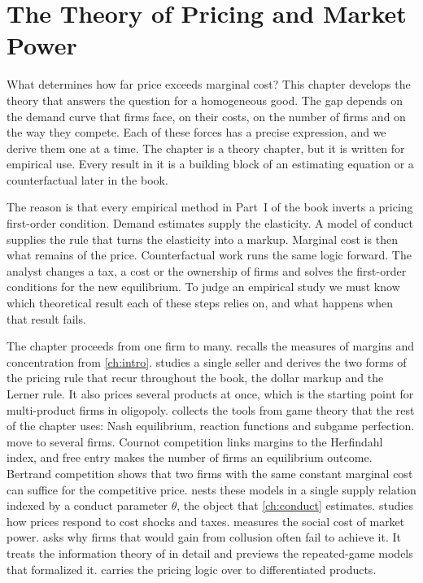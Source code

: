 \chapter{The Theory of Pricing and Market Power}\label{ch:theory}

What determines how far price exceeds marginal cost? This chapter develops the theory that answers the question for
a homogeneous good. The gap depends on the demand curve that firms face, on their costs, on the number of firms and
on the way they compete. Each of these forces has a precise expression, and we derive them one at a time. The
chapter is a theory chapter, but it is written for empirical use. Every result in it is a building block of an
estimating equation or a counterfactual later in the book.

The reason is that every empirical method in Part~I of the book inverts a pricing first-order condition. Demand
estimates supply the elasticity. A model of conduct supplies the rule that turns the elasticity into a markup.
Marginal cost is then what remains of the price. Counterfactual work runs the same logic forward. The analyst
changes a tax, a cost or the ownership of firms and solves the first-order conditions for the new equilibrium. To
judge an empirical study we must know which theoretical result each of these steps relies on, and what happens when
that result fails.

The chapter proceeds from one firm to many.  recalls the measures of margins and
concentration from \cref{ch:intro}.
 studies a single seller and derives the two forms of the pricing rule that recur throughout
the book, the dollar markup and the Lerner rule. It also prices several products at once, which is the starting point
for multi-product firms in oligopoly.  collects the tools from game theory that the rest of the
chapter uses: Nash equilibrium, reaction functions and subgame perfection.  move to
several firms. Cournot competition links margins to the Herfindahl index, and free entry makes the number of firms
an equilibrium outcome. Bertrand competition shows that two firms with the same constant marginal cost can suffice
for the competitive price.
 nests these models in a single supply relation indexed by a conduct parameter $\theta$, the
object that \cref{ch:conduct} estimates.  studies how prices respond to cost shocks and
taxes.  measures the social cost of market power.  asks why firms that
would gain from collusion often fail to achieve it. It treats the information theory of \citet{Stigler1964} in
detail and previews the repeated-game models that formalized it.  carries the pricing logic
over to differentiated products.

